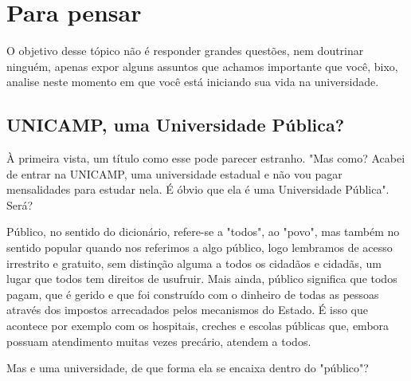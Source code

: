 
\section{Para pensar}

O objetivo desse tópico não é responder grandes questões, nem doutrinar ninguém,
apenas expor alguns assuntos que achamos importante que você, bixo, analise
neste momento em que você está iniciando sua vida na universidade.

\subsection{UNICAMP, uma Universidade Pública?}

À primeira vista, um título como esse pode parecer estranho. "Mas como? Acabei
de entrar na UNICAMP, uma universidade estadual e não vou pagar mensalidades
para estudar nela. É óbvio que ela é uma Universidade Pública". Será?

Público, no sentido do dicionário, refere-se a "todos", ao "povo", mas também no
sentido popular quando nos referimos a algo público, logo lembramos de acesso
irrestrito e gratuito, sem distinção alguma a todos os cidadãos e cidadãs, um
lugar que todos tem direitos de usufruir. Mais ainda, público significa que
todos pagam, que é gerido e que foi construído com o dinheiro de todas as
pessoas através dos impostos arrecadados pelos mecanismos do Estado. É isso que
acontece por exemplo com os hospitais, creches e escolas públicas que, embora
possuam atendimento muitas vezes precário, atendem a todos.

Mas e uma universidade, de que forma ela se encaixa dentro do "público"?

